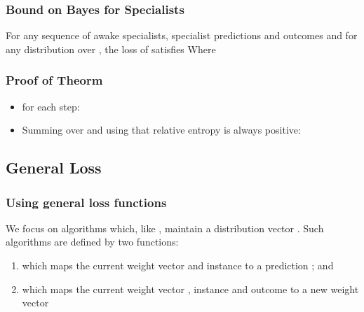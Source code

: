 \documentclass{beamer}
\begin{document}
\begin{frame}
\frametitle{Bound on Bayes for Specialists}
\begin{theorem} \label{thm:SBayes}
For any sequence of 
awake specialists, specialist predictions and outcomes
and for any distribution \R{$\vu$} over , the loss of
\B{\SBayes} satisfies
\R{\[
 \sum_{t=1}^T u(\aset{t}) \loss(\pred{t},\outcome{t})
\leq
 \sum_{t=1}^T 
  \sum_{i \in \aset{t}} \uu{i} \loss(\advice{i}{t},\outcome{t})
+
  \RE{\vu}{\vp{1}}~.
\]}
Where 
\end{theorem}
\end{frame}

\begin{frame}
\frametitle{Proof of Theorm}
\begin{itemize}
\item for each step:
\item Summing over  and using that
relative entropy is always positive:
\end{itemize}
\end{frame}

\subsection{General Loss}
\begin{frame}
\frametitle{Using general loss functions}
We focus on algorithms which, like \B{\Bayes}, maintain a
distribution vector .
Such algorithms are defined by two functions:
\begin{enumerate}
\item
{}
which maps the current weight vector  and instance
 to a prediction ; and
\item
{}
which maps the current weight vector , instance
 and outcome  to a new weight vector
\end{enumerate}
\end{frame}
\end{document}
